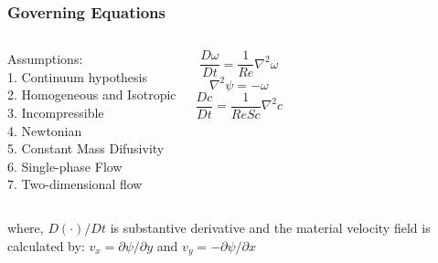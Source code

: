 
\begin{frame} 
 \frametitle{\LARGE Governing Equations}
\vspace{-1.2cm}
\begin{columns}[c]
Assumptions:\\[0.1cm]
\hspace{0.5cm}  1. Continuum hypothesis\\[0.1cm]
\hspace{0.5cm}  2. Homogeneous and Isotropic\\[0.1cm]
\hspace{0.5cm}  3. Incompressible\\[0.1cm]
\hspace{0.5cm}  4. Newtonian\\[0.1cm]
\hspace{0.5cm}  5. Constant Mass Difusivity\\[0.1cm]
\hspace{0.5cm}  6. Single-phase Flow\\[0.1cm]
\hspace{0.5cm}  7. Two-dimensional flow

\vspace{-1cm}
\begin{center}
\begin{equation*}
 \frac{D \omega}{Dt} = \frac{1}{Re} \nabla^{2} \omega
\end{equation*}
\medskip
\begin{equation*}
 \nabla^{2} \psi = - \omega
\end{equation*}
\medskip
\begin{equation*}
 \frac{Dc}{Dt} = \frac{1}{ReSc} \nabla^{2} c 
\end{equation*}
\end{center}
\end{columns}

\vspace{1.2cm}
\justifying
where, $D(\cdot)/Dt$ is substantive derivative and
the material velocity field is calculated by: 
$v_{x} = \partial \psi / \partial y$ and 
$v_{y} = - \partial \psi / \partial x$

\end{frame}




